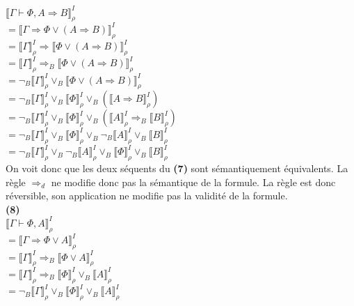 \documentclass[11pt,letterpaper]{article}
\begin{document}
$\llbracket \Gamma \vdash \Phi, A \Rightarrow B \rrbracket^{I}_ {\rho}$\\
$= \llbracket \Gamma \Rightarrow \Phi \lor (A \Rightarrow B) \rrbracket^{I}_ {\rho}$\\
$= \llbracket \Gamma \rrbracket^{I}_ {\rho} \Rightarrow \llbracket \Phi \lor (A \Rightarrow B) \rrbracket^{I}_ {\rho}$\\
$= \llbracket \Gamma \rrbracket^{I}_ {\rho} \Rightarrow_{B} \llbracket \Phi \lor (A \Rightarrow B) \rrbracket^{I}_ {\rho}$\\
$= \neg_{B}\llbracket \Gamma \rrbracket^{I}_ {\rho} \lor_{B} \llbracket \Phi \lor (A \Rightarrow B) \rrbracket^{I}_ {\rho}$\\
$= \neg_{B}\llbracket \Gamma \rrbracket^{I}_ {\rho} \lor_{B} \llbracket \Phi \rrbracket^{I}_ {\rho} \lor_{B} (\llbracket A \Rightarrow B \rrbracket^{I}_ {\rho})$\\
$= \neg_{B}\llbracket \Gamma \rrbracket^{I}_ {\rho} \lor_{B} \llbracket \Phi \rrbracket^{I}_ {\rho} \lor_{B} (\llbracket A \rrbracket^{I}_ {\rho} \Rightarrow_{B} \llbracket B \rrbracket^{I}_ {\rho})$\\
$= \neg_{B}\llbracket \Gamma \rrbracket^{I}_ {\rho} \lor_{B} \llbracket \Phi \rrbracket^{I}_ {\rho} \lor_{B} \neg_{B}\llbracket A \rrbracket^{I}_{\rho} \lor_{B} \llbracket B \rrbracket^{I}_ {\rho}$\\
$= \neg_{B}\llbracket \Gamma \rrbracket^{I}_ {\rho} \lor_{B} \neg_{B}\llbracket A \rrbracket^{I}_{\rho} \lor_{B} \llbracket \Phi \rrbracket^{I}_ {\rho} \lor_{B} \llbracket B \rrbracket^{I}_ {\rho}$\\

On voit donc que les deux séquents du \textbf{(7)} sont sémantiquement équivalents. La règle $\Rightarrow_{d}$ ne modifie donc pas la sémantique de la formule. La règle est donc réversible, son application ne modifie pas la validité de la formule. \\


\textbf{(8)}\\
$\llbracket \Gamma \vdash \Phi, A \rrbracket^{I}_ {\rho}$\\
$= \llbracket \Gamma \Rightarrow \Phi \lor A\rrbracket^{I}_ {\rho}$\\
$= \llbracket \Gamma \rrbracket^{I}_ {\rho} \Rightarrow_{B} \llbracket \Phi \lor A\rrbracket^{I}_ {\rho}$\\
$= \llbracket \Gamma \rrbracket^{I}_ {\rho}\Rightarrow_{B} \llbracket \Phi \rrbracket^{I}_ {\rho} \lor_{B} \llbracket A \rrbracket^{I}_ {\rho}  $\\
$= \neg_{B} \llbracket \Gamma \rrbracket^{I}_ {\rho} \lor_{B} \llbracket\Phi \rrbracket^{I}_ {\rho} \lor_{B} \llbracket A \rrbracket^{I}_ {\rho}$\\
\vspace{10px}
\end{document}

